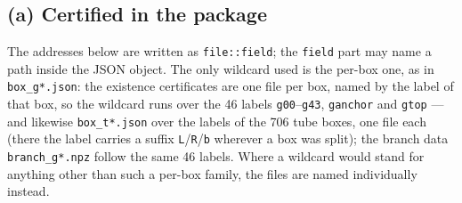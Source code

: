 \subsection*{(a) Certified in the package}
\label{sec:6.2.a}

The addresses below are written as \texttt{file::field}; the \texttt{field}
part may name a path inside the JSON object. The only wildcard used is the
per-box one, as in \texttt{box\_\allowbreak g*.json}: the existence certificates are one file
per box, named by the label of that box, so the wildcard runs over the 46
labels \texttt{g00}--\texttt{g43}, \texttt{ganchor} and \texttt{gtop} --- and likewise
\texttt{box\_\allowbreak t*.json} over the labels of the 706 tube boxes, one
file each (there the label carries a suffix \texttt{L}/\texttt{R}/\texttt{b}
wherever a box was split); the branch data \texttt{branch\_\allowbreak g*.npz}
follow the same 46 labels. Where a wildcard
would stand for anything other than such a per-box family, the files are named
individually instead.

